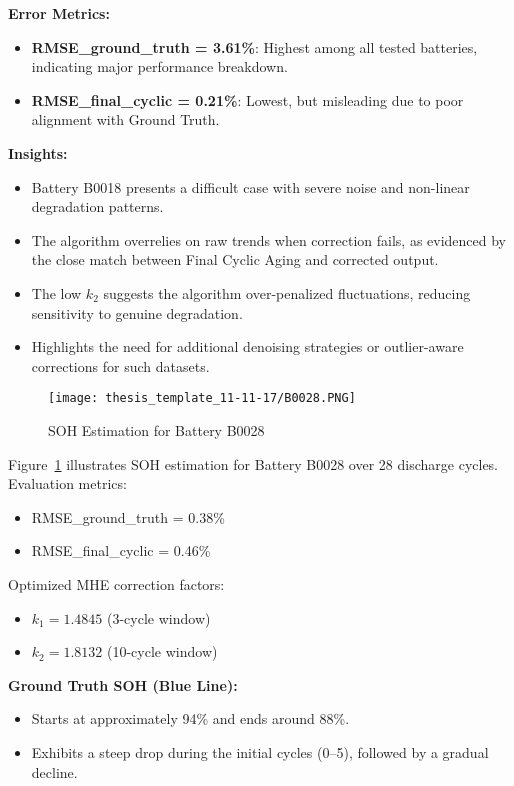 \vspace{0.5em}
\textbf{Error Metrics:}
\begin{itemize}
    \item \textbf{RMSE\_ground\_truth = 3.61\%}: Highest among all tested batteries, indicating major performance breakdown.
    \item \textbf{RMSE\_final\_cyclic = 0.21\%}: Lowest, but misleading due to poor alignment with Ground Truth.
\end{itemize}

\vspace{0.5em}
\textbf{Insights:}
\begin{itemize}
    \item Battery B0018 presents a difficult case with severe noise and non-linear degradation patterns.
    \item The algorithm overrelies on raw trends when correction fails, as evidenced by the close match between Final Cyclic Aging and corrected output.
    \item The low $k_2$ suggests the algorithm over-penalized fluctuations, reducing sensitivity to genuine degradation.
    \item Highlights the need for additional denoising strategies or outlier-aware corrections for such datasets.
\end{itemize}

\begin{figure}
    \centering
    \texttt{[image: thesis\_template\_11-11-17/B0028.PNG]}
    \caption{SOH Estimation for Battery B0028}
    \label{fig:resB0028}
\end{figure}

Figure~\ref{fig:resB0028} illustrates SOH estimation for Battery B0028 over 28 discharge cycles. Evaluation metrics:
\begin{itemize}
    \item RMSE\_ground\_truth = 0.38\%
    \item RMSE\_final\_cyclic = 0.46\%
\end{itemize}

Optimized MHE correction factors:
\begin{itemize}
    \item $k_1 = 1.4845$ (3-cycle window)
    \item $k_2 = 1.8132$ (10-cycle window)
\end{itemize}

\vspace{0.5em}
\textbf{Ground Truth SOH (Blue Line):}
\begin{itemize}
    \item Starts at approximately 94\% and ends around 88\%.
    \item Exhibits a steep drop during the initial cycles (0--5), followed by a gradual decline.
\end{itemize}

